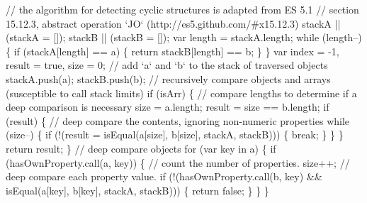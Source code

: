 \begin{DoxyCodeInclude}
{{\textcolor{stringliteral}{    // the algorithm for detecting cyclic structures is adapted from ES 5.1}
\textcolor{stringliteral}{    // section 15.12.3, abstract operation `JO` (http://es5.github.com/#x15.12.3)}
\textcolor{stringliteral}{    stackA || (stackA = []);}
\textcolor{stringliteral}{    stackB || (stackB = []);}
\textcolor{stringliteral}{}
\textcolor{stringliteral}{    var length = stackA.length;}
\textcolor{stringliteral}{    while (length--) \{}
\textcolor{stringliteral}{      if (stackA[length] == a) \{}
\textcolor{stringliteral}{        return stackB[length] == b;}
\textcolor{stringliteral}{      \}}
\textcolor{stringliteral}{    \}}
\textcolor{stringliteral}{}
\textcolor{stringliteral}{    var index = -1,}
\textcolor{stringliteral}{        result = true,}
\textcolor{stringliteral}{        size = 0;}
\textcolor{stringliteral}{}
\textcolor{stringliteral}{    // add `a` and `b` to the stack of traversed objects}
\textcolor{stringliteral}{    stackA.push(a);}
\textcolor{stringliteral}{    stackB.push(b);}
\textcolor{stringliteral}{}
\textcolor{stringliteral}{    // recursively compare objects and arrays (susceptible to call stack limits)}
\textcolor{stringliteral}{    if (isArr) \{}
\textcolor{stringliteral}{      // compare lengths to determine if a deep comparison is necessary}
\textcolor{stringliteral}{      size = a.length;}
\textcolor{stringliteral}{      result = size == b.length;}
\textcolor{stringliteral}{}
\textcolor{stringliteral}{      if (result) \{}
\textcolor{stringliteral}{        // deep compare the contents, ignoring non-numeric properties}
\textcolor{stringliteral}{        while (size--) \{}
\textcolor{stringliteral}{          if (!(result = isEqual(a[size], b[size], stackA, stackB))) \{}
\textcolor{stringliteral}{            break;}
\textcolor{stringliteral}{          \}}
\textcolor{stringliteral}{        \}}
\textcolor{stringliteral}{      \}}
\textcolor{stringliteral}{      return result;}
\textcolor{stringliteral}{    \}}
\textcolor{stringliteral}{    // deep compare objects}
\textcolor{stringliteral}{    for (var key in a) \{}
\textcolor{stringliteral}{      if (hasOwnProperty.call(a, key)) \{}
\textcolor{stringliteral}{        // count the number of properties.}
\textcolor{stringliteral}{        size++;}
\textcolor{stringliteral}{        // deep compare each property value.}
\textcolor{stringliteral}{        if (!(hasOwnProperty.call(b, key) && isEqual(a[key], b[key], stackA, stackB))) \{}
\textcolor{stringliteral}{          return false;}
\textcolor{stringliteral}{        \}}
\textcolor{stringliteral}{      \}}
\textcolor{stringliteral}{    \}}
}}
\end{DoxyCodeInclude}
